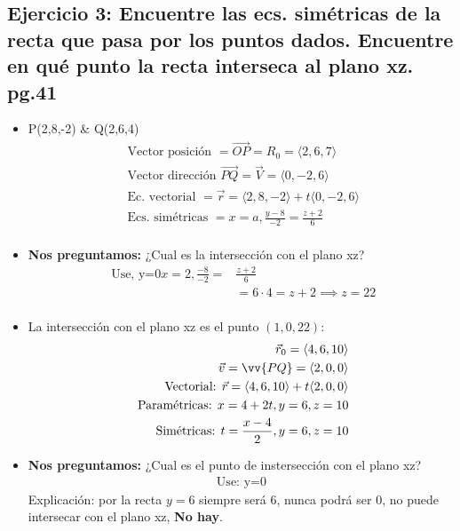\subsection{Ejercicio 3: Encuentre las ecs. simétricas de la recta que pasa por los puntos dados. Encuentre en qué punto la recta interseca al plano xz. pg.41}
\begin{itemize}
    \item P(2,8,-2) \& Q(2,6,4) 
    \begin{align*}
        \text{  Vector posición  } = \overrightarrow{OP} = R_0 = \langle 2,6,7 \rangle \\ 
        \text{  Vector dirección  } \overrightarrow{PQ} = \vec{V} = \langle 0,-2,6 \rangle \\ 
        \text{  Ec. vectorial  } = \vec{r} = \langle 2,8,-2 \rangle + t \langle 0,-2,6 \rangle \\
        \text{  Ecs. simétricas  } = x = a, \frac{y-8}{-2} = \frac{z+2}{6} \\   
    \end{align*}
    
    \item \textbf{Nos preguntamos:} ¿Cual es la intersección con el plano xz?
    \begin{align*}
        \text{  Use,  y=0} x = 2, \frac{-8}{-2} =&  \frac{z+2}{6} \\ 
        & = 6 \cdot 4 = z+ 2 \implies z= 22 \\ 
    \end{align*}

    
    \item La intersección con el plano xz es el punto $(1,0,22)$: 
    \begin{align*}
        \vec{r}_0 = \langle 4,6,10 \rangle \\ 
        \vec{v} = \vv{PQ} = \langle 2,0,0 \rangle \\ 
        \text{  Vectorial:    } \vec{r} = \langle 4,6,10 \rangle + t \langle 2,0,0 \rangle \\ 
        \text{  Paramétricas: } x = 4 + 2t, y = 6, z = 10 \\ 
        \text{  Simétricas:  }t = \frac{x-4}{2} , y = 6, z=10 \\  
    \end{align*}
    
    \item \textbf{Nos preguntamos:} ¿Cual es el punto de instersección con el plano xz?
    \begin{align*}
        \text{  Use: y=0  }
    \end{align*}
    Explicación: por la recta $y=6$ siempre será 6, nunca podrá ser $0$, no puede intersecar con el plano xz, \textbf{No hay}.
\end{itemize}


